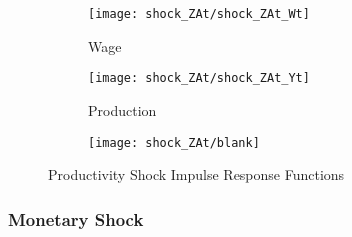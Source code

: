 \documentclass[
thesis.tex
]{subfiles}
\begin{document}
\begin{figure}[h!]
		\vspace*{0.5cm}
		
		\begin{subfigure}[b]{0.3\textwidth}
			\centering
			\texttt{[image: shock\_ZAt/shock\_ZAt\_Wt]}
			\caption{Wage}
			\label{fig:zat-wage}
		\end{subfigure}
		\hfill
		\begin{subfigure}[b]{0.3\textwidth}
			\centering
			\texttt{[image: shock\_ZAt/shock\_ZAt\_Yt]}
			\caption{Production}
			\label{fig:zat-production}
		\end{subfigure}
		\hfill
		\begin{subfigure}[b]{0.3\textwidth}
			\centering
			\texttt{[image: shock\_ZAt/blank]}
		\end{subfigure}
		\hfill
		\caption{Productivity Shock Impulse Response Functions}
		\label{fig:zat-irf}
	\end{figure}
	
	\newpage
	
	\subsubsection{Monetary Shock}
	
\end{document}
